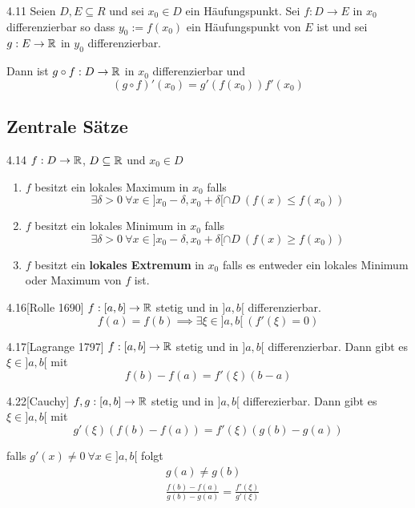 \begin{satz}{4.11}
    Seien $D, E \subseteq R$ und sei $x_0 \in D$ ein Häufungspunkt. Sei $f: D \to E$ in $x_0$ differenzierbar
    so dass $y_0 := f(x_0)$ ein Häufungspunkt von $E$ ist und sei $g: E \to \mathbb{R}$ in $y_0$ differenzierbar.

    Dann ist $g \circ f: D \to \mathbb{R}$ in $x_0$ differenzierbar und
    \[ (g \circ f)'(x_0) = g'(f(x_0))f'(x_0) \]
\end{satz}

\subsection{Zentrale Sätze}

\begin{definition}{4.14}
    $f: D \to \mathbb{R}$, $D \subseteq \mathbb{R}$ und $x_0 \in D$
    \begin{enumerate}
        \item $f$ besitzt ein lokales Maximum in $x_0$ falls
              \[
                  \exists \delta > 0\ \forall x \in ]x_0 - \delta, x_0 + \delta[ \cap D\ \left( f(x) \le f(x_0) \right)
              \]
        \item $f$ besitzt ein lokales Minimum in $x_0$ falls
              \[
                  \exists \delta > 0\ \forall x \in ]x_0 - \delta, x_0 + \delta[ \cap D\ \left( f(x) \ge f(x_0) \right)
              \]
        \item $f$ besitzt ein \textbf{lokales Extremum} in $x_0$ falls es entweder ein lokales Minimum oder Maximum von $f$ ist.
    \end{enumerate}
\end{definition}

\begin{satz}{4.16}[Rolle 1690]
    $f: [a, b] \to \mathbb{R}$ stetig und in $]a, b[$ differenzierbar.
            \[ f(a) = f(b) \implies \exists \xi \in ]a, b[\ \left( f'(\xi) = 0 \right) \]
\end{satz}

\begin{satz}{4.17}[Lagrange 1797]
    $f: [a, b] \to \mathbb{R}$ stetig und in $]a, b[$ differenzierbar. Dann gibt es $\xi \in ]a, b[$ mit
    \[ f(b) - f(a) = f'(\xi)(b - a) \]
\end{satz}

\begin{satz}{4.22}[Cauchy]
    $f,g : [a,b] \to \mathbb{R}$ stetig und in $]a, b[$ differezierbar.
                    Dann gibt es $\xi \in ]a, b[$ mit
                    \[ g'(\xi)(f(b) - f(a)) = f'(\xi)(g(b) - g(a)) \]

                    falls $g'(x) \ne 0\ \forall x \in ]a, b[$ folgt
    \begin{align*}
         & g(a) \ne g(b)                                             \\
         & \frac{f(b) - f(a)}{g(b) - g(a)} = \frac{f'(\xi)}{g'(\xi)}
    \end{align*}
\end{satz}

